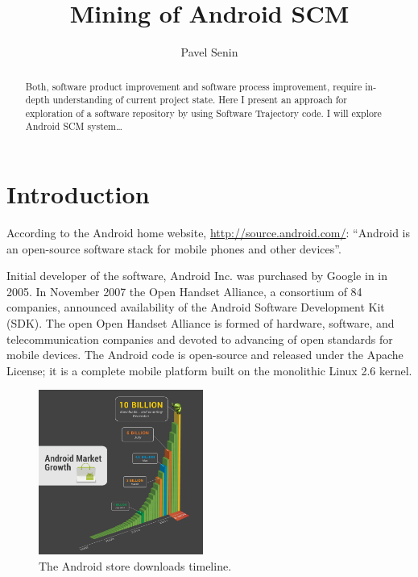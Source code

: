 \documentclass[a4paper]{article}
\numberwithin{equation}{subsection}
\begin{document}
\title{Mining of Android SCM}
\author{Pavel Senin}

\maketitle

\begin{abstract}
Both, software product improvement and software process improvement, require in-depth understanding 
of current project state. Here I present an approach for exploration of a software repository by 
using Software Trajectory code. I will explore Android SCM system\ldots

\end{abstract}

\section{Introduction}
According to the Android home website, \url{http://source.android.com/}: ``Android is an 
open-source software stack for mobile phones and other devices''.

Initial developer of the software, Android Inc. was purchased by Google in in 2005. In November 2007 
the Open Handset Alliance, a consortium of 84 companies, announced availability of the 
Android Software Development Kit (SDK). The open Open Handset Alliance is formed of hardware, 
software, and telecommunication companies and devoted to advancing of open standards for mobile 
devices. The Android code is open-source and released under the Apache License; it is a complete 
mobile platform built on the monolithic Linux 2.6 kernel. 

\begin{figure}
   \begin{center}
   \includegraphics[scale=0.3,bb=0 0 800 800,width=0.48\textwidth]{graph_only_3}
   \end{center}
   \caption{The Android store downloads timeline.}
   \label{fig:android_downloads}
\end{figure}
\end{document}
